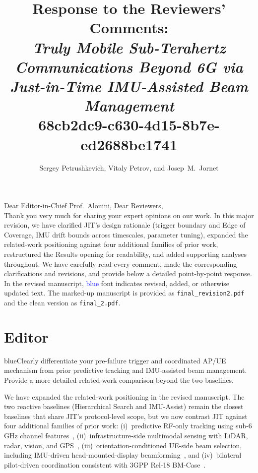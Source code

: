 \documentclass{article}
\title{\vspace{-2.5cm}\textbf{Response to the Reviewers' Comments: \\ \emph{\Large Truly Mobile Sub-Terahertz Communications Beyond 6G via Just-in-Time IMU-Assisted Beam Management}}\\\Large 68cb2dc9-c630-4d15-8b7e-ed2688be1741}
\author{Sergey Petrushkevich, Vitaly Petrov, and Josep~M.~Jornet\\}
\date{}
\newcommand{\blue}[1]{\begin{color}{blue}#1\end{color}}
\begin{document}
\maketitle

\noindent Dear Editor-in-Chief Prof.\ Alouini, Dear Reviewers,\\

\noindent Thank you very much for sharing your expert opinions on our work. In this major revision, we have clarified JIT's design rationale (trigger boundary and Edge of Coverage, IMU drift bounds across timescales, parameter tuning), expanded the related-work positioning against four additional families of prior work, restructured the Results opening for readability, and added supporting analyses throughout. We have carefully read every comment, made the corresponding clarifications and revisions, and provide below a detailed point-by-point response.\\

\noindent In the revised manuscript, \textcolor{blue}{blue} font indicates revised, added, or otherwise updated text. The marked-up manuscript is provided as \texttt{final\_revision2.pdf} and the clean version as \texttt{final\_2.pdf}.\\

\newpage

\section*{Editor}

\begin{tcbremark}
{\selectfont
\blue{Clearly differentiate your pre-failure trigger and coordinated AP/UE mechanism from prior predictive tracking and IMU-assisted beam management. Provide a more detailed related-work comparison beyond the two baselines.}
}
\end{tcbremark}

\noindent We have expanded the related-work positioning in the revised manuscript. The two reactive baselines (Hierarchical Search and IMU-Assist) remain the closest baselines that share JIT's protocol-level scope, but we now contrast JIT against four additional families of prior work: (i)~predictive RF-only tracking using sub-6\,GHz channel features~\cite{Alrabeiah2020DeepLearning}, (ii)~infrastructure-side multimodal sensing with LiDAR, radar, vision, and GPS~\cite{Alkhateeb2023DeepSense, Jiang2023LiDAR, Morais2023Position}, (iii)~orientation-conditioned UE-side beam selection, including IMU-driven head-mounted-display beamforming~\cite{Rezaie2022Orientation, Struye2023CoVRage}, and (iv)~bilateral pilot-driven coordination consistent with 3GPP Rel-18 BM-Case~\cite{Alkhateeb2018DLCB, Xue2023Standardization, Heng2021SixChallenges}.\\
\end{document}
